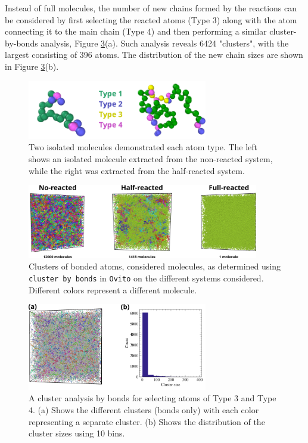 \documentclass[10pt,a4paper]{labreport}
\begin{document}
\begin{enumerate}
  Instead of full molecules, the number of new chains formed by the reactions can be considered by first selecting the reacted atoms (Type 3) along with the atom connecting it to the main chain (Type 4) and then performing a similar cluster-by-bonds analysis, Figure \ref{fig:ass1_full_reaction}(a). 
  Such analysis reveals 6424 "clusters", with the largest consisting of 396 atoms. The distribution of the new chain sizes are shown in Figure \ref{fig:ass1_full_reaction}(b).

  \begin{figure}[htbp]
    \centering 
    \includegraphics[width = 0.7\textwidth]{figs/ass1_molecules.png}
    \caption{Two isolated molecules demonstrated each atom type. The left shows an isolated molecule extracted from the non-reacted system, while the right was extracted from the half-reacted system.}
    \label{fig:ass1_molecules}
  \end{figure}
  \begin{figure}[htbp]
    \centering 
    \includegraphics[width = 0.9\textwidth]{figs/ass1_molecule_clusters.png}
    \caption{Clusters of bonded atoms, considered molecules, as determined using \texttt{cluster by bonds} in \texttt{Ovito} on the different systems considered. Different colors represent a different molecule.}
    \label{fig:cluster_analysis}
  \end{figure}
  \begin{figure}[htbp]
    \centering 
    \includegraphics[width = 0.7\textwidth]{figs/ass1_full-reaciton.png}
    \caption{A cluster analysis by bonds for selecting atoms of Type 3 and Type 4. (a) Shows the different clusters (bonds only) with each color representing a separate cluster. (b) Shows the distribution of the cluster sizes using 10 bins. }
    \label{fig:ass1_full_reaction}
  \end{figure}
  
\end{enumerate}
\newpage
\end{document}

